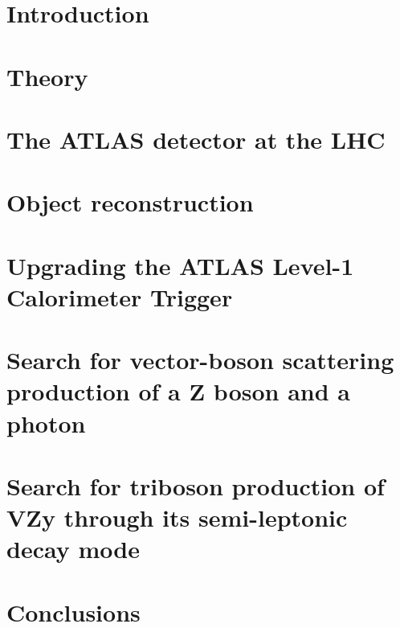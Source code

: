 \newcommand\relpath[1]{#1}
\newcommand\inputchapter[1]{}
\newcommand\resource[1]{#1}
\chapter{Introduction}
\inputchapter{introduction}

\chapter{Theory}
\inputchapter{theory}

\chapter{The ATLAS detector at the \acl{LHC}}
\inputchapter{detector}

\chapter{Object reconstruction}
\inputchapter{object-reco}

\chapter{Upgrading the ATLAS Level-1 Calorimeter Trigger}
\inputchapter{l1calo}

\chapter{Search for vector-boson scattering production of a Z boson and a photon}
\inputchapter{vbs}

\chapter{Search for triboson production of VZy through its semi-leptonic decay mode}
\inputchapter{vzy}

\chapter{Conclusions}
\inputchapter{conclusion}
